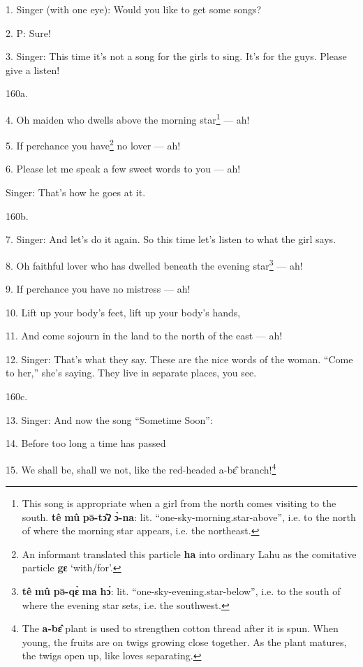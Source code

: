 \setcounter{footnote}{0}

1. Singer (with one eye): Would you like to get some songs?

2. P: Sure!

3. Singer: This time it's not a song for the girls to sing. It's for the guys. Please
give a listen!

160a. 

4. Oh maiden who dwells above the morning star\footnote{This song is appropriate when a girl from the north comes visiting to the south. \textbf{tê} \textbf{mû} \textbf{pə̄-tɔ̂ʔ} \textbf{ɔ̀-na}: lit. ``one-sky-morning.star-above'', i.e. to the north of where the morning star appears, i.e. the northeast.} --- ah!

5. If perchance you have\footnote{An informant translated this particle \textbf{ha} into ordinary Lahu as the comitative particle \textbf{gɛ} `with/for'.} no lover --- ah!

6. Please let me speak a few sweet words to you --- ah!

Singer: That's how he goes at it.

160b. 

7. Singer: And let's do it again. So this time let's listen to what the girl says.

8. Oh faithful lover who has dwelled beneath the evening star\footnote{\textbf{tê} \textbf{mû} \textbf{pə̄-qɛ̀} \textbf{ma} \textbf{hɔ́}: lit. ``one-sky-evening.star-below'', i.e. to the south of where the evening star sets, i.e. the southwest.} --- ah!

9. If perchance you have no mistress --- ah!

10. Lift up your body's feet, lift up your body's hands,

11. And come sojourn in the land to the north of the east --- ah!

12. Singer: That's what they say. These are the nice words of the woman. ``Come
to her,'' she's saying. They live in separate places, you see.

160c. 

13. Singer: And now the song ``Sometime Soon'':

14. Before too long a time has passed

15. We shall be, shall we not, like the red-headed a-bɛ̂ branch!\footnote{The \textbf{a-bɛ̂} plant is used to strengthen cotton thread after it is spun. When young, the fruits are on twigs growing close together. As the plant matures, the twigs open up, like loves separating.}

